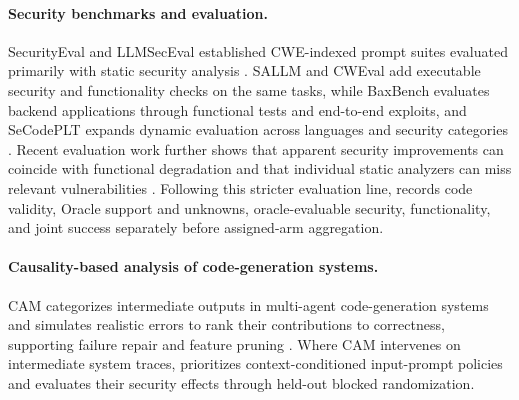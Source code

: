 \paragraph{Security benchmarks and evaluation.}
SecurityEval and LLMSecEval established CWE-indexed prompt suites evaluated
primarily with static security analysis
\cite{siddiq2022securityeval,tony2023llmseceval}.
SALLM and CWEval add executable security and functionality checks on the same
tasks, while BaxBench evaluates backend applications through functional tests
and end-to-end exploits, and SeCodePLT expands dynamic evaluation across
languages and security categories
\cite{siddiq2024sallm,peng2025cweval,vero2025baxbench,
nie2025secodeplt}.
Recent evaluation work further shows that apparent security improvements can
coincide with functional degradation and that individual static analyzers can
miss relevant vulnerabilities \cite{dai2026rethinking}.
Following this stricter evaluation line, \model records code validity, Oracle
support and unknowns, oracle-evaluable security, functionality, and joint
success separately before assigned-arm aggregation.

\paragraph{Causality-based analysis of code-generation systems.}
CAM categorizes intermediate outputs in multi-agent code-generation systems
and simulates realistic errors to rank their contributions to correctness,
supporting failure repair and feature pruning \cite{lyu2026cam}.
Where CAM intervenes on intermediate system traces, \model prioritizes
context-conditioned input-prompt policies and evaluates their security effects
through held-out blocked randomization.
